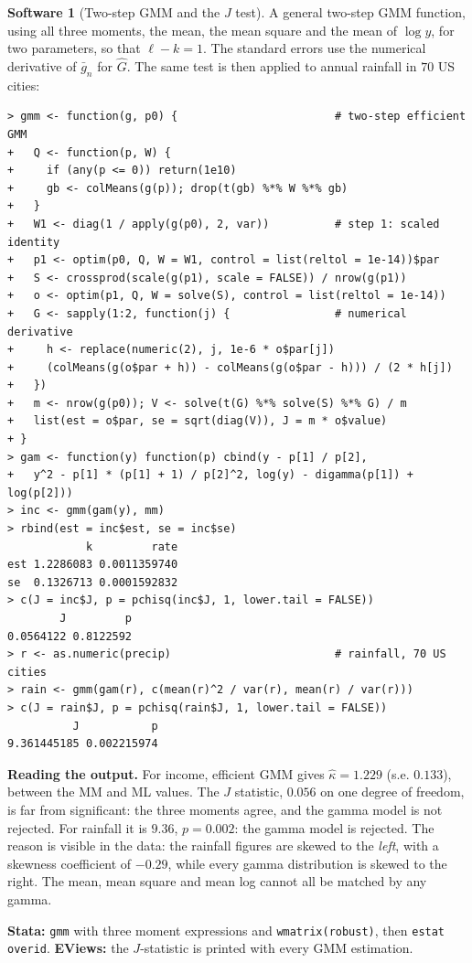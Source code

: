 \documentclass[11pt,a4paper]{article}
\numberwithin{equation}{section}
\theoremstyle{definition}
\newtheorem{software}[thm]{Software}
\begin{document}
\begin{software}[Two-step GMM and the $J$ test]
\label{sw:gmmgamma}
A general two-step GMM function, using all three moments, the mean, the mean square and the mean of $\log y$, for two parameters, so that $\ell - k = 1$. The
standard errors use the numerical derivative of $\bar g_n$ for $\hat G$. The same test is then applied to annual rainfall in $70$ US cities:
{\small\begin{verbatim}
> gmm <- function(g, p0) {                        # two-step efficient GMM
+   Q <- function(p, W) {
+     if (any(p <= 0)) return(1e10)
+     gb <- colMeans(g(p)); drop(t(gb) %*% W %*% gb)
+   }
+   W1 <- diag(1 / apply(g(p0), 2, var))          # step 1: scaled identity
+   p1 <- optim(p0, Q, W = W1, control = list(reltol = 1e-14))$par
+   S <- crossprod(scale(g(p1), scale = FALSE)) / nrow(g(p1))
+   o <- optim(p1, Q, W = solve(S), control = list(reltol = 1e-14))
+   G <- sapply(1:2, function(j) {                # numerical derivative
+     h <- replace(numeric(2), j, 1e-6 * o$par[j])
+     (colMeans(g(o$par + h)) - colMeans(g(o$par - h))) / (2 * h[j])
+   })
+   m <- nrow(g(p0)); V <- solve(t(G) %*% solve(S) %*% G) / m
+   list(est = o$par, se = sqrt(diag(V)), J = m * o$value)
+ }
> gam <- function(y) function(p) cbind(y - p[1] / p[2],
+   y^2 - p[1] * (p[1] + 1) / p[2]^2, log(y) - digamma(p[1]) + log(p[2]))
> inc <- gmm(gam(y), mm)
> rbind(est = inc$est, se = inc$se)
            k         rate
est 1.2286083 0.0011359740
se  0.1326713 0.0001592832
> c(J = inc$J, p = pchisq(inc$J, 1, lower.tail = FALSE))
        J         p 
0.0564122 0.8122592 
> r <- as.numeric(precip)                         # rainfall, 70 US cities
> rain <- gmm(gam(r), c(mean(r)^2 / var(r), mean(r) / var(r)))
> c(J = rain$J, p = pchisq(rain$J, 1, lower.tail = FALSE))
          J           p 
9.361445185 0.002215974 
\end{verbatim}}
\textbf{Reading the output.} For income, efficient GMM gives $\hat\kappa = 1.229$ (s.e. $0.133$), between the MM and ML values. The $J$ statistic, $0.056$ on one degree of freedom, is
far from significant: the three moments agree, and the gamma model is not rejected. For rainfall it is $9.36$, $p = 0.002$: the gamma model is rejected. The
reason is visible in the data: the rainfall figures are skewed to the \emph{left}, with a skewness coefficient of $-0.29$, while every gamma distribution is skewed to
the right. The mean, mean square and mean log cannot all be matched by any gamma.

\textbf{Stata:} \texttt{gmm} with three moment expressions and \texttt{wmatrix(robust)}, then \texttt{estat overid}. \textbf{EViews:} the $J$-statistic is printed with
every GMM estimation.
\end{software}
\end{document}
